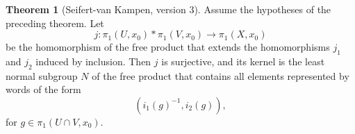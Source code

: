 \documentclass[12pt,a4paper]{book}
\theoremstyle{definition}
\newtheorem{theo}[defn]{Theorem}
\begin{document}
\begin{theo}[Seifert-van Kampen, version 3]
    Assume the hypotheses of the preceding theorem. Let
    $$
        j: \pi_1\left(U, x_0\right) * \pi_1\left(V, x_0\right) \longrightarrow \pi_1\left(X, x_0\right)
    $$
    be the homomorphism of the free product that extends the homomorphisms $j_1$ and $j_2$ induced by inclusion. Then $j$ is surjective, and its kernel is the least normal subgroup $N$ of the free product that contains all elements represented by words of the form
    $$
        \left(i_1(g)^{-1}, i_2(g)\right),
    $$
    for $g \in \pi_1\left(U \cap V, x_0\right)$.
    \label{theorem:Seifert-van Kampen,version 3}
\end{theo}







\newpage
\end{document}
